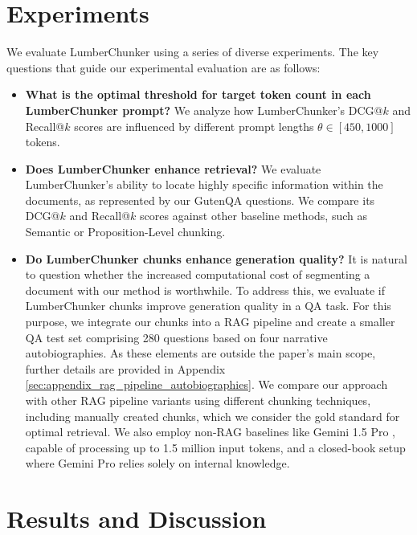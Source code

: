 \section{Experiments}

We evaluate LumberChunker using a series of diverse experiments. The key questions that guide our experimental evaluation are as follows:
\begin{itemize}[label=•, leftmargin=*]

\item \textbf{What is the optimal threshold for target token count in each LumberChunker prompt?} We analyze how LumberChunker's DCG@$k$ and Recall@$k$ scores are influenced by different prompt lengths $\theta \in [450, 1000]$ tokens.


\item \textbf{Does LumberChunker enhance retrieval?} We evaluate LumberChunker’s ability to locate highly specific information within the documents, as represented by our GutenQA questions. We compare its DCG@$k$ and Recall@$k$ scores against other baseline methods, such as Semantic or Proposition-Level chunking.


\item \textbf{Do LumberChunker chunks enhance generation quality?} It is natural to question whether the increased computational cost of segmenting a document with our method is worthwhile. To address this, we evaluate if LumberChunker chunks improve generation quality in a QA task. For this purpose, we integrate our chunks into a RAG pipeline and create a smaller QA test set comprising 280 questions based on four narrative autobiographies. As these elements are outside the paper's main scope, further details are provided in Appendix \ref{sec:appendix_rag_pipeline_autobiographies}. We compare our approach with other RAG pipeline variants using different chunking techniques, including manually created chunks, which we consider the gold standard for optimal retrieval. We also employ non-RAG baselines like Gemini 1.5 Pro \cite{gemini_1.5}, capable of processing up to 1.5 million input tokens, and a closed-book setup where Gemini Pro relies solely on internal knowledge.

\end{itemize}



\section{Results and Discussion}


